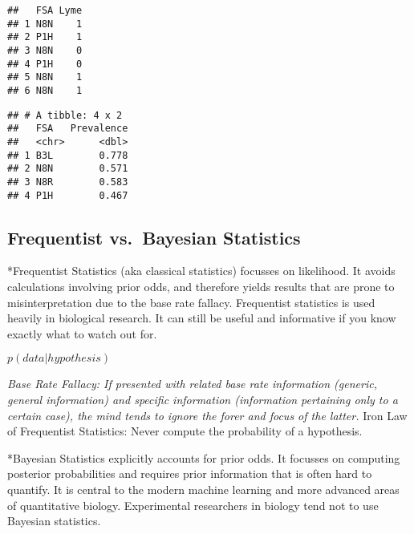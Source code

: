 \documentclass[]{article}
\newenvironment{Shaded}{\begin{snugshade}}{\end{snugshade}}
\newcommand{\CommentTok}[1]{\textcolor[rgb]{0.56,0.35,0.01}{\textit{#1}}}
\newcommand{\DataTypeTok}[1]{\textcolor[rgb]{0.13,0.29,0.53}{#1}}
\newcommand{\FloatTok}[1]{\textcolor[rgb]{0.00,0.00,0.81}{#1}}
\newcommand{\KeywordTok}[1]{\textcolor[rgb]{0.13,0.29,0.53}{\textbf{#1}}}
\newcommand{\NormalTok}[1]{#1}
\newcommand{\OperatorTok}[1]{\textcolor[rgb]{0.81,0.36,0.00}{\textbf{#1}}}
\newcommand{\StringTok}[1]{\textcolor[rgb]{0.31,0.60,0.02}{#1}}
\begin{document}
\begin{verbatim}
##   FSA Lyme
## 1 N8N    1
## 2 P1H    1
## 3 N8N    0
## 4 P1H    0
## 5 N8N    1
## 6 N8N    1
\end{verbatim}

\begin{Shaded}
\end{Shaded}

\begin{verbatim}
## # A tibble: 4 x 2
##   FSA   Prevalence
##   <chr>      <dbl>
## 1 B3L        0.778
## 2 N8N        0.571
## 3 N8R        0.583
## 4 P1H        0.467
\end{verbatim}

\hypertarget{frequentist-vs.bayesian-statistics}{%
\subsection{Frequentist vs.~Bayesian
Statistics}\label{frequentist-vs.bayesian-statistics}}

*Frequentist Statistics (aka classical statistics) focusses on
likelihood. It avoids calculations involving prior odds, and therefore
yields results that are prone to misinterpretation due to the base rate
fallacy. Frequentist statistics is used heavily in biological research.
It can still be useful and informative if you know exactly what to watch
out for.

\(p(data|hypothesis)\)

\emph{Base Rate Fallacy: If presented with related base rate information
(generic, general information) and specific information (information
pertaining only to a certain case), the mind tends to ignore the forer
and focus of the latter. }Iron Law of Frequentist Statistics: Never
compute the probability of a hypothesis.

*Bayesian Statistics explicitly accounts for prior odds. It focusses on
computing posterior probabilities and requires prior information that is
often hard to quantify. It is central to the modern machine learning and
more advanced areas of quantitative biology. Experimental researchers in
biology tend not to use Bayesian statistics.
\end{document}
